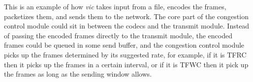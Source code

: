This is an example of how \emph{vic} takes input from a file, encodes the
frames, packetizes them, and sends them to the network. The core part of the
congestion control module could sit in between the codecs and the transmit
module. Instead of passing the encoded frames directly to the transmit module,
the encoded frames could be queued in some send buffer, and the congestion
control module picks up the frames determined by its suggested rate, for
example, if it is TFRC then it picks up the frames in a certain interval, or if
it is TFWC then it pick up the frames as long as the sending window allows. 

\newpage
